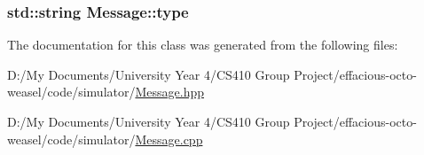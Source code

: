 \subsubsection[{\texorpdfstring{type}{type}}]{\setlength{\rightskip}{0pt plus 5cm}std\+::string Message\+::type\hspace{0.3cm}{\ttfamily [private]}}\hypertarget{class_message_ae9dead264183a4243c120026e6259b6f}{}\label{class_message_ae9dead264183a4243c120026e6259b6f}


The documentation for this class was generated from the following files\+:\begin{DoxyCompactItemize}
\item 
D\+:/\+My Documents/\+University Year 4/\+C\+S410 Group Project/effacious-\/octo-\/weasel/code/simulator/\hyperlink{_message_8hpp}{Message.\+hpp}\item 
D\+:/\+My Documents/\+University Year 4/\+C\+S410 Group Project/effacious-\/octo-\/weasel/code/simulator/\hyperlink{_message_8cpp}{Message.\+cpp}\end{DoxyCompactItemize}
